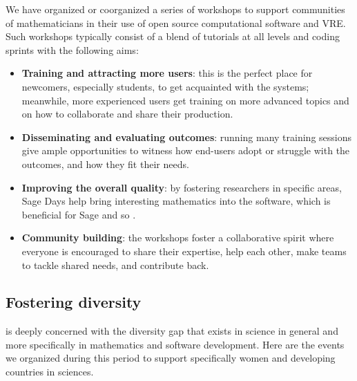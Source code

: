 \documentclass{deliverablereport}
\begin{document}
We have organized or coorganized a series of workshops to support
communities of mathematicians in their use of open source
computational software and VRE. Such workshops typically consist of a
blend of tutorials at all levels and coding sprints with the following
aims:

\begin{itemize}
\item \textbf{Training and attracting more users}: this is the perfect
  place for newcomers, especially students, to get acquainted with the
  systems; meanwhile, more experienced users get training on more
  advanced topics and on how to collaborate and share their
  production.

\item \textbf{Disseminating and evaluating \ODK outcomes}: running
  many training sessions give ample opportunities to witness how
  end-users adopt or struggle with the \ODK outcomes, and how they fit
  their needs.

\item \textbf{Improving the overall quality}: by fostering researchers
  in specific areas, Sage Days help bring interesting mathematics into
  the software, which is beneficial for Sage and so \ODK.

\item \textbf{Community building}: the workshops foster a
  collaborative spirit where everyone is encouraged to share their
  expertise, help each other, make teams to tackle shared needs, and
  contribute back.
\end{itemize}



















\subsection{Fostering diversity}

\ODK is deeply concerned with the diversity gap that exists in science
in general and more specifically in mathematics and software
development. Here are the events we organized during this period to
support specifically women and developing countries in sciences.
\end{document}
